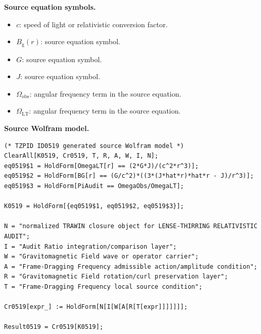 \begin{minipage}[t]{0.49\linewidth}
\begingroup
\small
\raggedright
\textbf{Source equation symbols.}\par
\begin{itemize}[leftmargin=1.35em,itemsep=1pt,topsep=1pt,parsep=0pt]
    \item $c$: speed of light or relativistic conversion factor.
    \item $B_{\mathrm{g}}(r)$: source equation symbol.
    \item $G$: source equation symbol.
    \item $J$: source equation symbol.
    \item $\Omega_{\mathrm{obs}}$: angular frequency term in the source equation.
    \item $\Omega_{\mathrm{LT}}$: angular frequency term in the source equation.
\end{itemize}
\endgroup
\end{minipage}\hfill
\begin{minipage}[t]{0.47\linewidth}
\begingroup
\scriptsize
\raggedright
\textbf{Source Wolfram model.}\par
\begin{Verbatim}[fontsize=\tiny,breaklines=true,breakanywhere=true]
(* TZPID ID0519 generated source Wolfram model *)
ClearAll[K0519, Cr0519, T, R, A, W, I, N];
eq0519$1 = HoldForm[OmegaLT[r] == (2*G*J)/(c^2*r^3)];
eq0519$2 = HoldForm[BG[r] == (G/c^2)*((3*(J*hat*r)*hat*r - J)/r^3)];
eq0519$3 = HoldForm[PiAudit == OmegaObs/OmegaLT];

K0519 = HoldForm[{eq0519$1, eq0519$2, eq0519$3}];

N = "normalized TRAWIN closure object for LENSE-THIRRING RELATIVISTIC AUDIT";
I = "Audit Ratio integration/comparison layer";
W = "Gravitomagnetic Field wave or operator carrier";
A = "Frame-Dragging Frequency admissible action/amplitude condition";
R = "Gravitomagnetic Field rotation/curl preservation layer";
T = "Frame-Dragging Frequency local source condition";

Cr0519[expr_] := HoldForm[N[I[W[A[R[T[expr]]]]]]];

Result0519 = Cr0519[K0519];
\end{Verbatim}
\endgroup
\end{minipage}

